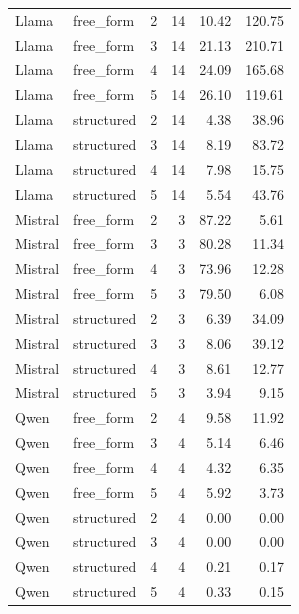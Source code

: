 \begin{longtable}{llrrrr}
Llama & free\_form & 2 & 14 & 10.42 & 120.75 \\
Llama & free\_form & 3 & 14 & 21.13 & 210.71 \\
Llama & free\_form & 4 & 14 & 24.09 & 165.68 \\
Llama & free\_form & 5 & 14 & 26.10 & 119.61 \\
Llama & structured & 2 & 14 & 4.38 & 38.96 \\
Llama & structured & 3 & 14 & 8.19 & 83.72 \\
Llama & structured & 4 & 14 & 7.98 & 15.75 \\
Llama & structured & 5 & 14 & 5.54 & 43.76 \\
Mistral & free\_form & 2 & 3 & 87.22 & 5.61 \\
Mistral & free\_form & 3 & 3 & 80.28 & 11.34 \\
Mistral & free\_form & 4 & 3 & 73.96 & 12.28 \\
Mistral & free\_form & 5 & 3 & 79.50 & 6.08 \\
Mistral & structured & 2 & 3 & 6.39 & 34.09 \\
Mistral & structured & 3 & 3 & 8.06 & 39.12 \\
Mistral & structured & 4 & 3 & 8.61 & 12.77 \\
Mistral & structured & 5 & 3 & 3.94 & 9.15 \\
Qwen & free\_form & 2 & 4 & 9.58 & 11.92 \\
Qwen & free\_form & 3 & 4 & 5.14 & 6.46 \\
Qwen & free\_form & 4 & 4 & 4.32 & 6.35 \\
Qwen & free\_form & 5 & 4 & 5.92 & 3.73 \\
Qwen & structured & 2 & 4 & 0.00 & 0.00 \\
Qwen & structured & 3 & 4 & 0.00 & 0.00 \\
Qwen & structured & 4 & 4 & 0.21 & 0.17 \\
Qwen & structured & 5 & 4 & 0.33 & 0.15 \\
\end{longtable}
